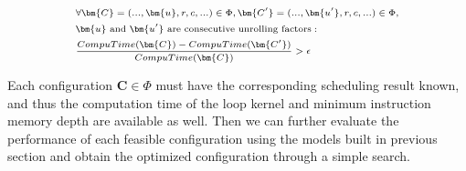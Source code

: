 \begin{equation} \label{eq:cond2}
    \scriptsize
    \begin{split}
        &\forall \bm{C}=(...,\bm{u},r,c,...) \in \Phi, \bm{C'}=(...,\bm{u'},r,c,...) \in \Phi,\\ 
        &\bm{u} \text{ and } \bm{u'} \text{ are consecutive unrolling factors}: \\
        &\frac{CompuTime(\bm{C})-CompuTime(\bm{C'})}{CompuTime(\bm{C})} > \epsilon
    \end{split}
\end{equation}

Each configuration $\bm{C} \in \Phi$ must have the corresponding 
scheduling result known, and thus the computation time of the 
loop kernel and minimum instruction memory depth are available as well. Then we can further evaluate 
the performance of each feasible configuration using the models built in 
previous section and obtain the optimized configuration through a simple search.




